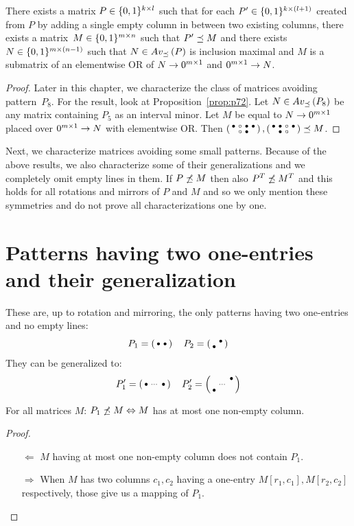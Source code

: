 \begin{prop}
There exists a matrix $P\in\{0,1\}^{k\times l}$ such that for each $P'\in\{0,1\}^{k\times(l+1)}$ created from $P$ by adding a single empty column in between two existing columns, there exists a matrix~$M\in\{0,1\}^{m\times n}$ such that $P'\preceq M$ and there exists $N\in\{0,1\}^{m\times(n-1)}$ such that $N\in Av_{\preceq}\left(P\right)$ is inclusion maximal and $M$ is a submatrix of an elementwise OR of $N\rightarrow 0^{m\times 1}$ and $0^{m\times 1}\rightarrow N$.
\end{prop}
\begin{proof}
Later in this chapter, we characterize the class of matrices avoiding pattern~$P_8$. For the result, look at Proposition~\ref{prop:p72}. Let $N\in Av_{\preceq}\left(P_8\right)$ be any matrix containing $P_5$ as an interval minor. Let $M$ be equal to $N\rightarrow 0^{m\times 1}$ placed over $0^{m\times 1}\rightarrow N$ with elementwise OR. Then $\left(\begin{smallmatrix}\bullet&\circ&\bullet&\bullet\\ &\circ&\bullet& \end{smallmatrix}\right),\left(\begin{smallmatrix}\bullet&\bullet&\circ&\bullet\\ &\bullet&\circ& \end{smallmatrix}\right)\preceq M$.
\end{proof}

Next, we characterize matrices avoiding some small patterns. Because of the above results, we also characterize some of their generalizations and we completely omit empty lines in them. If $P\not\preceq M$ then also $P^T\not\preceq M^T$ and this holds for all rotations and mirrors of $P$ and $M$ and so we only mention these symmetries and do not prove all characterizations one by one.

\section{Patterns having two one-entries and their generalization}
\label{sec:2ones}
These are, up to rotation and mirroring, the only patterns having two one-entries and no empty lines:
$$P_1=\left(\begin{smallmatrix}\bullet&\bullet\end{smallmatrix}\right)\ \ \ P_2=\left(\begin{smallmatrix} &\bullet\\\bullet& \end{smallmatrix}\right)$$
They can be generalized to:
$$P'_1=\smm{\bullet&\cdots&\bullet}\ \ \ P'_2=\smm{ & &\bullet\\ &\cdots& \\\bullet& & }$$

\begin{prop}
For all matrices $M$: $P_1\not\preceq M\Leftrightarrow M$ has at most one non-empty column.
\end{prop}
\begin{proof}
\begin{itemize}
	\item[$\Leftarrow$] $M$ having at most one non-empty column does not contain $P_1$.
	\item[$\Rightarrow$] When $M$ has two columns $c_1,c_2$ having a one-entry $M[r_1,c_1],M[r_2,c_2]$ respectively, those give us a mapping of $P_1$.
\end{itemize}
\end{proof}

